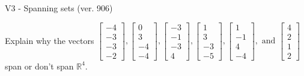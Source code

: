 \begin{exercise}
  \begin{exerciseTitle}V3 - Spanning sets (ver. 906)\end{exerciseTitle}
  \begin{exerciseStatement}
    Explain why the vectors \(\left[\begin{array}{r}
-4 \\
-3 \\
-3 \\
-2
\end{array}\right] , \left[\begin{array}{r}
0 \\
3 \\
-4 \\
-4
\end{array}\right] , \left[\begin{array}{r}
-3 \\
-1 \\
-3 \\
4
\end{array}\right] , \left[\begin{array}{r}
1 \\
3 \\
-3 \\
-5
\end{array}\right] , \left[\begin{array}{r}
1 \\
-1 \\
4 \\
-4
\end{array}\right] , \text{ and } \left[\begin{array}{r}
4 \\
2 \\
1 \\
2
\end{array}\right]\) span or don't span \(\mathbb{R}^4\). 
	



\end{exerciseStatement}
\end{exercise}
